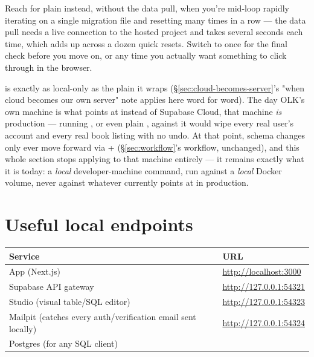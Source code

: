 \begin{olktip}
Reach for plain  instead, without the data pull, when you're mid-loop rapidly iterating on a single migration file and resetting many times in a row — the data pull needs a live connection to the hosted project and takes several seconds each time, which adds up across a dozen quick resets. Switch to  once for the final check before you move on, or any time you actually want something to click through in the browser.
\end{olktip}

\begin{olkwarn}
 is exactly as local-only as the plain  it wraps (\S\ref{sec:cloud-becomes-server}'s "when cloud becomes our own server" note applies here word for word). The day OLK's own machine is what  points at instead of Supabase Cloud, that machine \emph{is} production — running , or even plain , against it would wipe every real user's account and every real book listing with no undo. At that point, schema changes only ever move forward via  +  (\S\ref{sec:workflow}'s workflow, unchanged), and this whole section stops applying to that machine entirely — it remains exactly what it is today: a \emph{local} developer-machine command, run against a \emph{local} Docker volume, never against whatever  currently points at in production.
\end{olkwarn}

\section{Useful local endpoints}

\begin{center}
\begin{tabularx}{\textwidth}{@{}l Y@{}}
\toprule
\textbf{Service} & \textbf{URL} \\
\midrule
App (Next.js) & \url{http://localhost:3000} \\
Supabase API gateway & \url{http://127.0.0.1:54321} \\
Studio (visual table/SQL editor) & \url{http://127.0.0.1:54323} \\
Mailpit (catches every auth/verification email sent locally) & \url{http://127.0.0.1:54324} \\
Postgres (for any SQL client) &  \\
\bottomrule
\end{tabularx}
\end{center}

